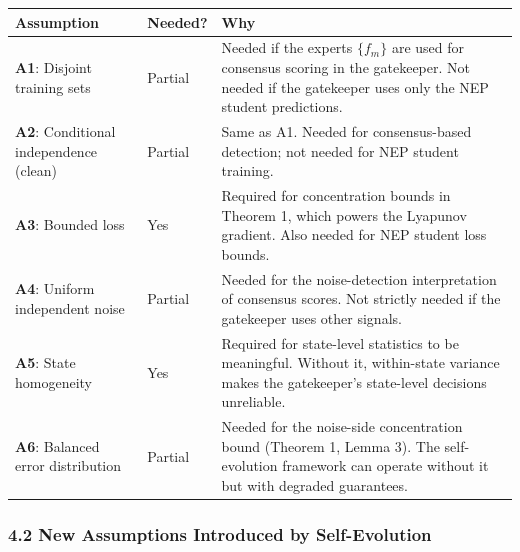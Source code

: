 \documentclass[
  12pt,
]{ctexart}
\begin{document}
\begin{longtable}[]{@{}
  >{\raggedright\arraybackslash}p{}
  >{\raggedright\arraybackslash}p{}
  >{\raggedright\arraybackslash}p{}@{}}
\toprule\noalign{}
\begin{minipage}[b]{\linewidth}\raggedright
Assumption
\end{minipage} & \begin{minipage}[b]{\linewidth}\raggedright
Needed?
\end{minipage} & \begin{minipage}[b]{\linewidth}\raggedright
Why
\end{minipage} \\
\midrule\noalign{}
\endhead
\bottomrule\noalign{}
\endlastfoot
\textbf{A1}: Disjoint training sets & Partial & Needed if the experts
\(\{f_m\}\) are used for consensus scoring in the gatekeeper. Not needed
if the gatekeeper uses only the NEP student predictions. \\
\textbf{A2}: Conditional independence (clean) & Partial & Same as A1.
Needed for consensus-based detection; not needed for NEP student
training. \\
\textbf{A3}: Bounded loss & Yes & Required for concentration bounds in
Theorem 1, which powers the Lyapunov gradient. Also needed for NEP
student loss bounds. \\
\textbf{A4}: Uniform independent noise & Partial & Needed for the
noise-detection interpretation of consensus scores. Not strictly needed
if the gatekeeper uses other signals. \\
\textbf{A5}: State homogeneity & Yes & Required for state-level
statistics to be meaningful. Without it, within-state variance makes the
gatekeeper's state-level decisions unreliable. \\
\textbf{A6}: Balanced error distribution & Partial & Needed for the
noise-side concentration bound (Theorem 1, Lemma 3). The self-evolution
framework can operate without it but with degraded guarantees. \\
\end{longtable}

\subsubsection{4.2 New Assumptions Introduced by
Self-Evolution}\label{new-assumptions-introduced-by-self-evolution}
\end{document}
